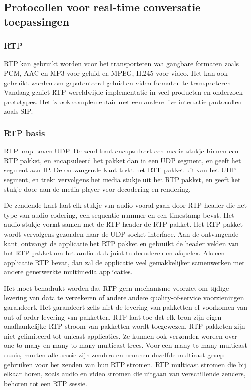 \subsection{Protocollen voor real-time conversatie toepassingen}

\subsubsection{RTP}

\noindent RTP kan gebruikt worden voor het transporteren van gangbare formaten zoals PCM, AAC en MP3 voor geluid en MPEG, H.245 voor video. Het kan ook gebruikt worden om gepatenteerd geluid en video formaten te transporteren. Vandaag geniet RTP wereldwijde implementatie in veel producten en onderzoek prototypes. Het is ook complementair met een andere live interactie protocollen zoals SIP.

\subsubsection{RTP basis}

\noindent RTP loop boven UDP. De zend kant encapsuleert een media stukje binnen een RTP pakket, en encapsuleerd het pakket dan in een UDP segment, en geeft het segment aan IP. De ontvangende kant trekt het RTP pakket uit van het UDP segment, en trekt vervolgens het media stukje uit het RTP pakket, en geeft het stukje door aan de media player voor decodering en rendering.

\noindent De zendende kant laat elk stukje van audio vooraf gaan door RTP header die het type van audio codering, een sequentie nummer en een timestamp bevat. Het audio stukje vormt samen met de RTP header de RTP pakket. Het RTP pakket wordt vervolgens gezonden naar de UDP socket interface. Aan de ontvangende kant, ontvangt de applicatie het RTP pakket en gebruikt de header velden van het RTP pakket om het audio stuk juist te decoderen en afspelen.
Als een applicatie RTP bevat, dan zal de applicatie veel gemakkelijker samenwerken met andere genetwerkte multimedia applicaties.

\noindent Het moet benadrukt worden dat RTP geen mechanisme voorziet om tijdige levering van data te verzekeren of andere andere quality-of-service voorzieningen garandeert. Het garandeert zelfs niet de levering van pakketten of voorkomen van out-of-order levering van pakketten.
RTP laat toe dat elk bron zijn eigen onafhankelijke RTP stroom van pakketten wordt toegewezen. RTP pakketen zijn niet gelimiteerd tot unicast applicaties. Ze kunnen ook verzonden worden over one-to-many en many-to-many multicast trees. Voor een many-to-many multicast sessie, moeten alle sessie zijn zenders en bronnen dezelfde multicast groep gebruiken voor het zenden van hun RTP stromen. RTP multicast stromen die bij elkaar horen, zoals audio en video stromen die uitgaan van verschillende zenders, behoren tot een RTP sessie.




